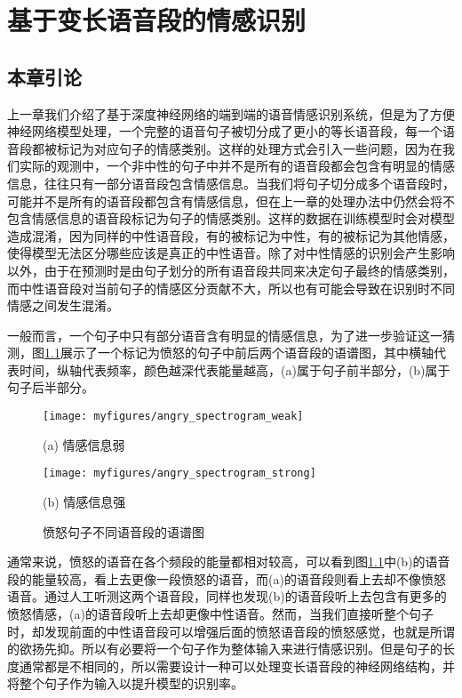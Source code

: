 \chapter{基于变长语音段的情感识别}
\label{cha:var_len}

\section{本章引论}
\label{sec:var_len_intro}

上一章我们介绍了基于深度神经网络的端到端的语音情感识别系统，但是为了方便神经网络模型处理，一个完整的语音句子被切分成了更小的等长语音段，每一个语音段都被标记为对应句子的情感类别。这样的处理方式会引入一些问题，因为在我们实际的观测中，一个非中性的句子中并不是所有的语音段都会包含有明显的情感信息，往往只有一部分语音段包含情感信息。当我们将句子切分成多个语音段时，可能并不是所有的语音段都包含有情感信息，但在上一章的处理办法中仍然会将不包含情感信息的语音段标记为句子的情感类别。这样的数据在训练模型时会对模型造成混淆，因为同样的中性语音段，有的被标记为中性，有的被标记为其他情感，使得模型无法区分哪些应该是真正的中性语音。除了对中性情感的识别会产生影响以外，由于在预测时是由句子划分的所有语音段共同来决定句子最终的情感类别，而中性语音段对当前句子的情感区分贡献不大，所以也有可能会导致在识别时不同情感之间发生混淆。

一般而言，一个句子中只有部分语音含有明显的情感信息，为了进一步验证这一猜测，图\ref{fig:angry_spectrogram}展示了一个标记为愤怒的句子中前后两个语音段的语谱图，其中横轴代表时间，纵轴代表频率，颜色越深代表能量越高，(a)属于句子前半部分，(b)属于句子后半部分。

\begin{figure}[htb]
    \vspace{-0cm}  %
    \setlength{\belowcaptionskip}{0cm}   %
    \begin{minipage}{0.48\textwidth}
        \centering
        \texttt{[image: myfigures/angry\_spectrogram\_weak]}
        \centerline{(a) 情感信息弱}\medskip
    \end{minipage}\hfill
    \begin{minipage}{0.48\textwidth}
        \centering
        \texttt{[image: myfigures/angry\_spectrogram\_strong]}
        \centerline{(b) 情感信息强}\medskip
    \end{minipage}
    \caption{愤怒句子不同语音段的语谱图}
    \label{fig:angry_spectrogram}
\end{figure}

通常来说，愤怒的语音在各个频段的能量都相对较高，可以看到图\ref{fig:angry_spectrogram}中(b)的语音段的能量较高，看上去更像一段愤怒的语音，而(a)的语音段则看上去却不像愤怒语音。通过人工听测这两个语音段，同样也发现(b)的语音段听上去包含有更多的愤怒情感，(a)的语音段听上去却更像中性语音。然而，当我们直接听整个句子时，却发现前面的中性语音段可以增强后面的愤怒语音段的愤怒感觉，也就是所谓的欲扬先抑。所以有必要将一个句子作为整体输入来进行情感识别。但是句子的长度通常都是不相同的，所以需要设计一种可以处理变长语音段的神经网络结构，并将整个句子作为输入以提升模型的识别率。

